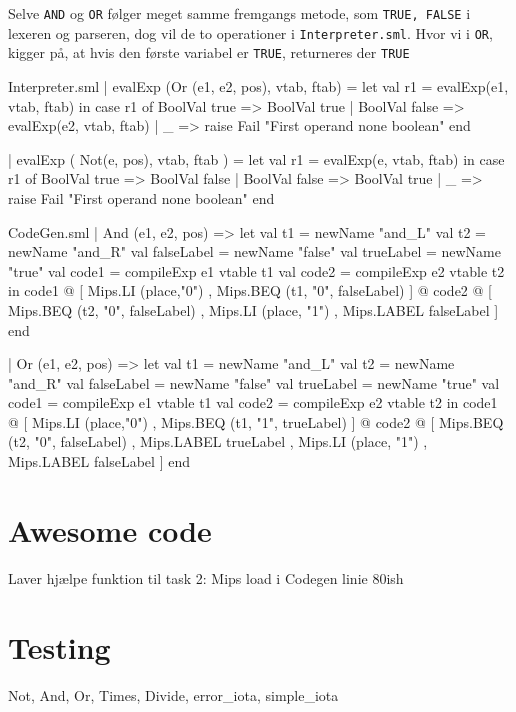 \documentclass[11pt,a4paper,oneside]{report}
\begin{document}
Selve \texttt{AND} og \texttt{OR} følger meget samme fremgangs metode, som \texttt{TRUE, FALSE} i lexeren og parseren, dog vil de to operationer i \texttt{Interpreter.sml}. Hvor vi i \texttt{OR}, kigger på, at hvis den første variabel er \texttt{TRUE}, returneres der \texttt{TRUE}

\begin{code}[firstnumber=190]{Interpreter.sml}
| evalExp (Or (e1, e2, pos), vtab, ftab) =
        let
          val r1 = evalExp(e1, vtab, ftab)
        in
          case r1 of
               BoolVal true => BoolVal true
             | BoolVal false  => evalExp(e2, vtab, ftab)
             | _ => raise Fail "First operand none boolean"
        end

  | evalExp ( Not(e, pos), vtab, ftab ) =
        let
          val r1 = evalExp(e, vtab, ftab)
        in
          case r1 of
               BoolVal true => BoolVal false
             | BoolVal false  => BoolVal true
             | _ => raise Fail "First operand none boolean"
        end
\end{code}

\begin{code}[firstnumber=408]{CodeGen.sml}
  | And (e1, e2, pos) =>
    let val t1 = newName "and_L"
        val t2 = newName "and_R"
        val falseLabel = newName "false"
        val trueLabel = newName "true"
        val code1 = compileExp e1 vtable t1
        val code2 = compileExp e2 vtable t2
    in
      code1 @
      [ Mips.LI (place,"0")
      , Mips.BEQ (t1, "0", falseLabel) ]
      @ code2 @
      [ Mips.BEQ (t2, "0", falseLabel)
      , Mips.LI (place, "1")
      , Mips.LABEL falseLabel ]
    end

  | Or (e1, e2, pos) =>
    let val t1 = newName "and_L"
        val t2 = newName "and_R"
        val falseLabel = newName "false"
        val trueLabel = newName "true"
        val code1 = compileExp e1 vtable t1
        val code2 = compileExp e2 vtable t2
    in
            code1 @
            [ Mips.LI (place,"0")
            , Mips.BEQ (t1, "1", trueLabel) ]
            @ code2 @
            [ Mips.BEQ (t2, "0", falseLabel)
            , Mips.LABEL trueLabel
            , Mips.LI (place, "1")
            , Mips.LABEL falseLabel ]    end
\end{code}

\section{Awesome code}
Laver hjælpe funktion til task 2: Mips load i Codegen linie 80ish

\section{Testing}
Not, And, Or, Times, Divide, error_iota, simple_iota




\end{document}
